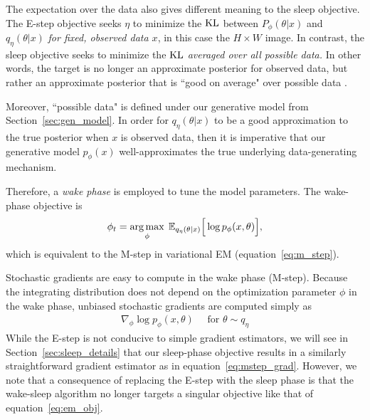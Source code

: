 The expectation over the data also gives different meaning to the sleep objective. The E-step objective seeks $\eta$ to minimize the $\textrm{KL}$ between $P_\phi(\theta | x)$ and $q_\eta(\theta | x)$ {\itshape for fixed, observed data $x$},
in this case the $H\times W$ image. In contrast, the sleep objective seeks to minimize the $\textrm{KL}$ {\itshape averaged over all possible data. } In other words, the target is no longer an approximate posterior for observed data, but rather an approximate posterior that is ``good on average" over possible data .

Moreover, ``possible data" is defined under our generative model from Section~\ref{sec:gen_model}. In order for $q_\eta(\theta | x)$ to be a good approximation to
the true posterior when $x$ is observed data, then it is imperative that our generative model $p_\phi(x)$ well-approximates the true underlying data-generating mechanism. 

Therefore, a {\itshape wake phase} is employed to tune the model parameters. The wake-phase objective is
\begin{align}
    \phi_{t} = \operatorname*{arg\,max}_{\phi} \; \mathbb{E}_{q_{\eta}(\theta | x)}\Big[\log p_\phi(x, \theta)\Big], 
    \label{eq:wake_elbo}
\end{align}
which is equivalent to the M-step in variational EM (equation~\ref{eq:m_step}). 

Stochastic gradients are easy to compute in the wake phase (M-step). Because the integrating distribution does not depend on the optimization parameter $\phi$ in the wake phase, unbiased stochastic gradients are computed simply as 
\begin{align}
    \nabla_\phi \log p_\phi(x, \theta) \quad \text{ for } \theta\sim q_\eta
    \label{eq:mstep_grad}
\end{align}
While the E-step is not conducive to simple gradient estimators, we will see in Section~\ref{sec:sleep_details} that our sleep-phase objective
results in a similarly straightforward gradient estimator as in equation~\eqref{eq:mstep_grad}. However,
we note that a consequence of replacing the E-step with the sleep phase is that the wake-sleep algorithm no longer targets a singular objective like that of equation~\eqref{eq:em_obj}. 


